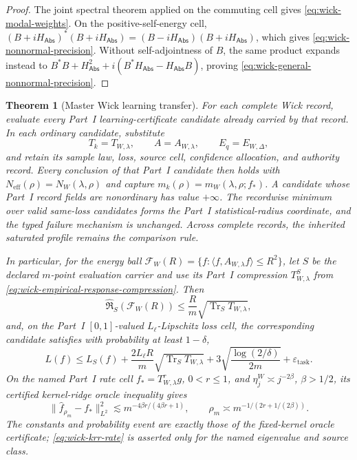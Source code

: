 \documentclass[11pt]{article}
\numberwithin{section}{part}
\theoremstyle{plain}
\newtheorem{theorem}{Theorem}[section]
\theoremstyle{definition}
\theoremstyle{remark}
\newcommand{\Abs}{\mathsf{Abs}}
\begin{document}
\begin{proof}
The joint spectral theorem applied on the commuting cell gives
\eqref{eq:wick-modal-weights}.  On the positive-self-energy cell,
\((B+iH_{\Abs})^*(B+iH_{\Abs})=(B-iH_{\Abs})(B+iH_{\Abs})\), which gives
\eqref{eq:wick-nonnormal-precision}.  Without self-adjointness of \(B\), the
same product expands instead to
\(B^*B+H_{\Abs}^2+i(B^*H_{\Abs}-H_{\Abs}B)\), proving
\eqref{eq:wick-general-nonnormal-precision}.
\end{proof}

\begin{theorem}[Master Wick learning transfer]
\label{thm:wick-master-learning-transfer}
For each complete Wick record, evaluate every Part~I learning-certificate
candidate already carried by that record.  In each ordinary candidate,
substitute
\begin{equation}
 \label{eq:wick-learning-dictionary}
 T_k=T_{W,\lambda},\qquad
 A=A_{W,\lambda},\qquad
 E_q=E_{W,\Delta},
\end{equation}
and retain its sample law, loss, source cell, confidence allocation, and
authority record.  Every conclusion of that Part~I candidate then holds with
\(N_{\mathrm{eff}}(\rho)=N_W(\lambda,\rho)\) and capture
\(m_k(\rho)=m_W(\lambda,\rho;f_*)\).  A candidate whose Part~I record fields
are nonordinary has value \(+\infty\).  The recordwise minimum over valid
same-loss candidates forms the Part~I statistical-radius coordinate, and the
typed failure mechanism is unchanged.  Across complete records, the inherited
saturated profile remains the comparison rule.

In particular, for the energy ball
\(\mathcal F_W(R)=\{f:\langle f,A_{W,\lambda}f\rangle\le R^2\}\),
let \(S\) be the declared \(m\)-point evaluation carrier and use its Part~I
compression \(T_{W,\lambda}^S\) from
\eqref{eq:wick-empirical-response-compression}.  Then
\begin{equation}
 \label{eq:wick-rademacher}
 \widehat{\mathfrak R}_S(\mathcal F_W(R))
 \le\frac{R}{m}\sqrt{\operatorname{Tr}_S T_{W,\lambda}},
\end{equation}
and, on the Part~I \([0,1]\)-valued \(L_\ell\)-Lipschitz loss cell, the
corresponding candidate satisfies with probability at least \(1-\delta\),
\begin{equation}
 \label{eq:wick-fixed-operator-risk}
 L(f)\le L_S(f)
 +\frac{2L_\ell R}{m}\sqrt{\operatorname{Tr}_S T_{W,\lambda}}
 +3\sqrt{\frac{\log(2/\delta)}{2m}}
 +\varepsilon_{\mathrm{task}}.
\end{equation}
On the named Part~I rate cell
\(f_*=T_{W,\lambda}^{r}g\), \(0<r\le1\), and
\(\eta_j^W\asymp j^{-2\beta}\), \(\beta>1/2\), its certified
kernel-ridge oracle inequality gives
\begin{equation}
 \label{eq:wick-krr-rate}
 \|\widehat f_{\rho_m}-f_*\|_{L^2}^2
 \lesssim m^{-4\beta r/(4\beta r+1)},
 \qquad
 \rho_m\asymp m^{-1/(2r+1/(2\beta))}.
\end{equation}
The constants and probability event are exactly those of the fixed-kernel
oracle certificate; \eqref{eq:wick-krr-rate} is asserted only for the named
eigenvalue and source class.
\end{theorem}
\end{document}
